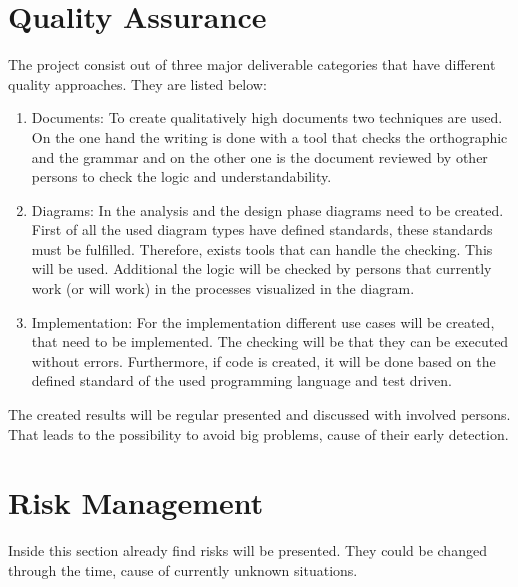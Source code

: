 \section{Quality Assurance}
The project consist out of three major deliverable categories that have different quality approaches. They are listed below:
\begin{enumerate}
	\item Documents: \newline
	To create qualitatively high documents two techniques are used. On the one hand the writing is done with a tool that checks the orthographic and the grammar and on the other one is the document reviewed by other persons to check the logic and understandability. 
	\item Diagrams: \newline
	In the analysis and the design phase diagrams need to be created. First of all the used diagram types have defined standards, these standards must be fulfilled. Therefore, exists tools that can handle the checking. This will be used. Additional the logic will be checked by persons that currently work (or will work) in the processes visualized in the diagram. 
	\item Implementation: \newline
	For the implementation different use cases will be created, that need to be implemented. The checking will be that they can be executed without errors. Furthermore, if code is created, it will be done based on the defined standard of the used programming language and test driven.
\end{enumerate}
The created results will be regular presented and discussed with involved persons. That leads to the possibility to avoid big problems, cause of their early detection.

\section{Risk Management}
Inside this section already find risks will be presented. They could be changed through the time, cause of currently unknown situations.

